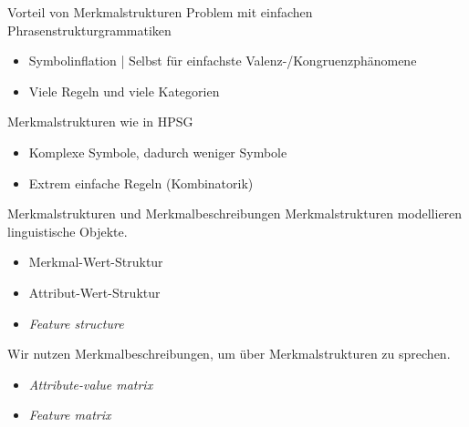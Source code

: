 \begin{frame}
  {Vorteil von Merkmalstrukturen}
  \onslide<+->
  \onslide<+->
  Problem mit einfachen \alert{Phrasenstrukturgrammatiken}\\
  \Halbzeile
  \begin{itemize}[<+->]
    \item \alert{Symbolinflation} | Selbst für einfachste Valenz-\slash Kongruenzphänomene
    \item Viele Regeln und viele Kategorien
  \end{itemize}
  \onslide<+->
  \Zeile
  \alert{Merkmalstrukturen} wie in HPSG\\
  \Halbzeile
  \begin{itemize}[<+->]
    \item \alert{Komplexe Symbole}, dadurch weniger Symbole
    \item Extrem einfache \alert{Regeln} (Kombinatorik)
  \end{itemize}
\end{frame}

\begin{frame}
  {Merkmalstrukturen und Merkmalbeschreibungen}
  \onslide<+->
  \onslide<+->
  \alert{Merkmalstrukturen} modellieren linguistische Objekte.\\
  \Halbzeile
  \begin{itemize}[<+->]
    \item Merkmal-Wert-Struktur
    \item Attribut-Wert-Struktur
    \item \emph{Feature structure}
  \end{itemize}
  \onslide<+->
  \Zeile
  Wir nutzen \alert{Merkmalbeschreibungen}, um über Merkmalstrukturen zu sprechen.\\
  \Halbzeile
  \begin{itemize}[<+->]
    \item \emph{Attribute-value matrix}
    \item \emph{Feature matrix}
  \end{itemize}
  \onslide<+->
  \Zeile
  \centering 
\end{frame}

